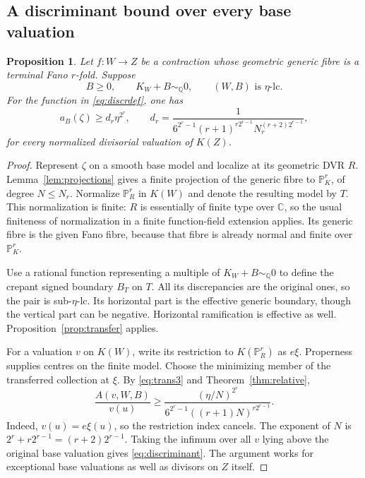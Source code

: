 \documentclass[11pt,reqno]{amsart}
\numberwithin{equation}{section}
\newtheorem{proposition}[theorem]{Proposition}
\theoremstyle{definition}
\theoremstyle{remark}
\newcommand{\Q}{\mathbb Q}
\newcommand{\C}{\mathbb C}
\newcommand{\PP}{\mathbb P}
\newcommand{\simq}{\sim_{\Q}}
\begin{document}
\subsection{A discriminant bound over every base valuation}
\begin{proposition}\label{prop:discriminant}
Let $f:W\to Z$ be a contraction whose geometric generic fibre is a terminal Fano $r$-fold. Suppose
\[
 B\ge0,\qquad K_W+B\simq0,\qquad (W,B)\text{ is }\eta\text{-lc}.
\]
For the function in \eqref{eq:discrdef}, one has
\begin{equation}\label{eq:discriminant}
 a_B(\zeta)\ge d_r\eta^{2^r},\qquad
 d_r=\frac{1}{6^{2^r-1}(r+1)^{r2^{r-1}}N_r^{(r+2)2^{r-1}}},
\end{equation}
for every normalized divisorial valuation of $K(Z)$.
\end{proposition}
\begin{proof}
Represent $\zeta$ on a smooth base model and localize at its geometric DVR $R$. Lemma~\ref{lem:projections} gives a finite projection of the generic fibre to $\PP^r_K$, of degree $N\le N_r$. Normalize $\PP^r_R$ in $K(W)$ and denote the resulting model by $T$. This normalization is finite: $R$ is essentially of finite type over $\C$, so the usual finiteness of normalization in a finite function-field extension applies. Its generic fibre is the given Fano fibre, because that fibre is already normal and finite over $\PP^r_K$.

Use a rational function representing a multiple of $K_W+B\simq0$ to define the crepant signed boundary $B_T$ on $T$. All its discrepancies are the original ones, so the pair is sub-$\eta$-lc. Its horizontal part is the effective generic boundary, though the vertical part can be negative. Horizontal ramification is effective as well. Proposition~\ref{prop:transfer} applies.

For a valuation $v$ on $K(W)$, write its restriction to $K(\PP^r_R)$ as $e\xi$. Properness supplies centres on the finite model. Choose the minimizing member of the transferred collection at $\xi$. By \eqref{eq:trans3} and Theorem~\ref{thm:relative},
\[
 \frac{A(v,W,B)}{v(u)}
 \ge\frac{(\eta/N)^{2^r}}
 {6^{2^r-1}((r+1)N)^{r2^{r-1}}}.
\]
Indeed, $v(u)=e\xi(u)$, so the restriction index cancels. The exponent of $N$ is $2^r+r2^{r-1}=(r+2)2^{r-1}$. Taking the infimum over all $v$ lying above the original base valuation gives \eqref{eq:discriminant}. The argument works for exceptional base valuations as well as divisors on $Z$ itself.
\end{proof}
\end{document}

